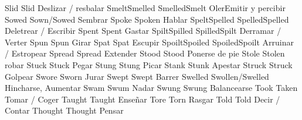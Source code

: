 	            {Slid}{}	            {Slid}{}                {Deslizar / resbalar}{}
	            {Smelt}{Smelled}	    {Smelled}{Smelt}        {Oler}{Emitir y percibir}
	            {Sowed}{}	            {Sown/Sowed}{}          {Sembrar}{}
	            {Spoke}{}	            {Spoken}{}              {Hablar}{}
	            {Spelt}{Spelled}	    {Spelled}{Spelled}      {Deletrear / Escribir}{}
	            {Spent}{}	            {Spent}{}               {Gastar}{}
	            {Spilt}{Spilled}	    {Spilled}{Spilt}        {Derramar / Verter}{}
	            {Spun}{}	            {Spun}{}                {Girar}{}
	            {Spat}{}	            {Spat}{}                {Escupir}{}
	            {Spoilt}{Spoiled}	    {Spoiled}{Spoilt}       {Arruinar / Estropear}{}
	            {Spread}{}	            {Spread}{}              {Extender}{}
	            {Stood}{}	            {Stood}{}               {Ponerse de pie}{}
	            {Stole}{}	            {Stolen}{}              {robar}{}
	            {Stuck}{}	            {Stuck}{}               {Pegar}{}
	            {Stung}{}	            {Stung}{}               {Picar}{}
	            {Stank}{}	            {Stunk}{}               {Apestar}{}
	            {Struck}{}	            {Struck}{}              {Golpear}{}
	            {Swore}{}	            {Sworn}{}               {Jurar}{}
	            {Swept}{}	            {Swept}{}               {Barrer}{}
	            {Swelled}{}	            {Swollen/Swelled}{}     {Hincharse, Aumentar}{}
	            {Swam}{}	            {Swum}{}                {Nadar}{}
	            {Swung}{}	            {Swung}{}               {Balancearse}{}
	            {Took}{}	            {Taken}{}               {Tomar / Coger}{}
	            {Taught}{}	            {Taught}{}              {Enseñar}{}
	            {Tore}{}	            {Torn}{}                {Rasgar}{}
	            {Told}{}	            {Told}{}                {Decir / Contar}{}
	            {Thought}{}	            {Thought}{}             {Pensar}{}
